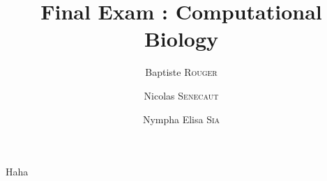 \documentclass[12pt,a4paper]{report}
\author{Baptiste \textsc{Rouger} \and Nicolas \textsc{Senecaut} \and Nympha Elisa \textsc{Sia}}
\title{Final Exam : Computational Biology}
\begin{document}
\maketitle

Haha
\end{document}
